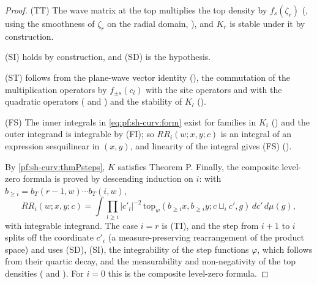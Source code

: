 \begin{proof}
(TT) The wave matrix at the top multiplies the top density by $f_s(\zeta_r)$
(, using the smoothness of $\zeta_r$ on the radial domain,
), and $K_r$ is stable under it by construction.

(SI) holds by construction, and (SD) is the hypothesis.

(ST) follows from the plane-wave vector identity (), the
commutation of the multiplication operators by $f_{\pm s}(c_l)$ with the site operators and with the quadratic operators
( and ) and the stability of
$K_l$ ().

(FS) The inner integrals in \eqref{eq:pf:sh-curv:form} exist for families in $K_i$
() and the outer integrand is integrable by (FI); so
$RR_i(w;x,y;c)$ is an integral of an expression sesquilinear in $(x,y)$, and linearity of the integral gives (FS)
().

By \cref{pf:sh-curv:thmPsteps}, $K$ satisfies Theorem P. Finally, the composite level-zero formula is proved by descending
induction on $i$: with $b_{\ge i}=b_T(r-1,w)\cdots b_T(i,w)$,
\[
RR_i(w;x,y;c)=\int\prod_{l\ge i}|c'_l|^{-2}\,\mathrm{top}_w(b_{\ge i}x,b_{\ge i}y;c\sqcup_ic',g)\,dc'\,d\mu(g),
\]
with integrable integrand. The case $i=r$ is (TI), and the step from $i+1$ to $i$ splits off the coordinate $c'_i$ (a
measure-preserving rearrangement of the product space) and uses (SD), (SI), the integrability of the step functions
$\varphi$, which follows from their quartic decay, and the measurability and non-negativity of the top densities
( and ). For
$i=0$ this is the composite level-zero formula.
\end{proof}

